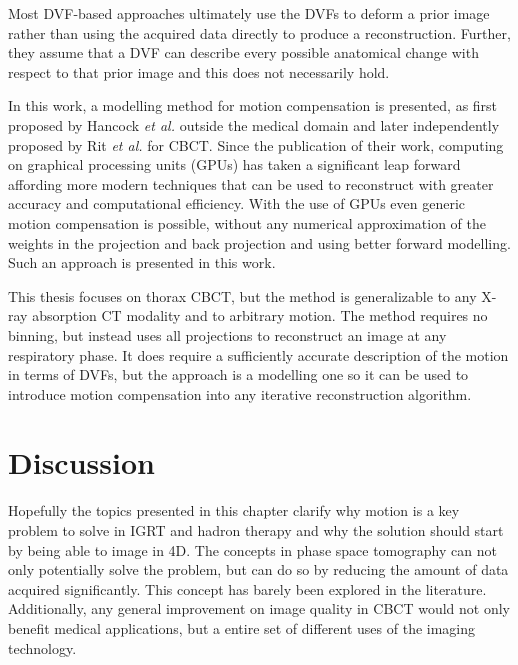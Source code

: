 Most DVF-based approaches ultimately use the DVFs to deform a prior image rather than using the acquired data directly to produce a reconstruction.  Further, they assume that a DVF can describe every possible anatomical change with respect to that prior image and this does not necessarily hold.

In this work, a modelling method for motion compensation is presented, as first proposed by Hancock \textit{et al.}\cite{pst1} outside the medical domain and later independently proposed by Rit \textit{et al.}\cite{Rit1}\cite{Rit2} for CBCT. Since the publication of their work, computing on graphical processing units (GPUs) has taken a significant leap forward affording more modern techniques that can be used to reconstruct with greater accuracy and computational efficiency. With the use of GPUs even generic motion compensation is possible, without any numerical approximation of the weights in the projection and back projection and using better forward modelling\cite{fwdproj}. Such an approach is presented in this work.

This thesis focuses on thorax CBCT, but the method is generalizable to any X-ray absorption CT modality and to arbitrary motion.  The method requires no binning, but instead uses all projections to reconstruct an image at any respiratory phase.  It does require a sufficiently accurate description of the motion in terms of DVFs, but the approach is a modelling one so it can be used to introduce motion compensation into any iterative reconstruction algorithm. 

\section{Discussion}

Hopefully the topics presented in this chapter clarify why motion is a key problem to solve in IGRT and hadron therapy and why the solution should start by being able to image in 4D. The concepts in phase space tomography can not only  potentially solve the problem, but can do so by reducing the amount of data acquired significantly. This concept has barely been explored in the literature. Additionally, any general improvement on image quality in CBCT would not only benefit medical applications, but a entire set of different uses of the imaging technology.